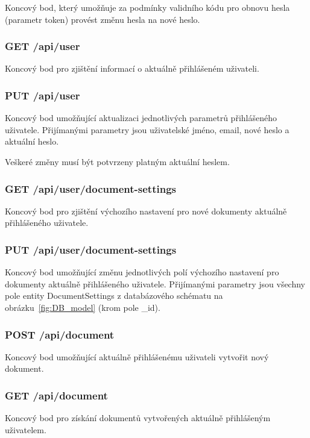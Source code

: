 Koncový bod, který umožňuje za podmínky validního kódu pro obnovu hesla (parametr token) provést změnu hesla na nové heslo.

\subsubsection{GET /api/user}

Koncový bod pro zjištění informací o aktuálně přihlášeném uživateli.

\subsubsection{PUT /api/user}

Koncový bod umožňující aktualizaci jednotlivých parametrů přihlášeného uživatele.
Přijímanými parametry jsou uživatelské jméno, email, nové heslo a aktuální heslo.

Veškeré změny musí být potvrzeny platným aktuální heslem.

\subsubsection{GET /api/user/document-settings}

Koncový bod pro zjištění výchozího nastavení pro nové dokumenty aktuálně přihlášeného uživatele.

\subsubsection{PUT /api/user/document-settings}

Koncový bod umožňující změnu jednotlivých polí výchozího nastavení pro dokumenty aktuálně přihlášeného uživatele.
Přijímanými parametry jsou všechny pole entity DocumentSettings z databázového schématu na obrázku~\ref{fig:DB_model} (krom pole \_id).

\subsubsection{POST /api/document}

Koncový bod umožňující aktuálně přihlášenému uživateli vytvořit nový dokument.

\subsubsection{GET /api/document}

Koncový bod pro získání dokumentů vytvořených aktuálně přihlášeným uživatelem.

